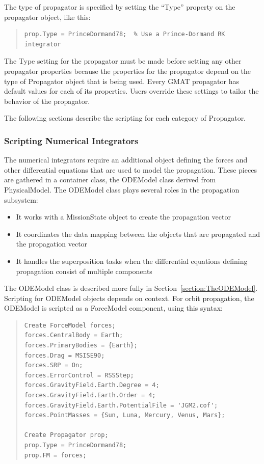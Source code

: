 The type of propagator is specified by setting the ``Type'' property on the propagator object, like
this:
\begin{quote}
\begin{verbatim}
prop.Type = PrinceDormand78;  % Use a Prince-Dormand RK integrator
\end{verbatim}
\end{quote}

\noindent The Type setting for the propagator must be made before setting any other propagator
properties because the properties for the propagator depend on the type of Propagator object that is
being used.  Every GMAT propagator has default values for each of its properties.  Users override
these settings to tailor the behavior of the propagator.

The following sections describe the scripting for each category of Propagator.

\subsubsection{Scripting Numerical Integrators}

The numerical integrators require an additional object defining the forces and other differential
equations that are used to model the propagation.  These pieces are gathered in a container class,
the ODEModel class derived from PhysicalModel.  The ODEModel class plays several roles in the
propagation subsystem:

\begin{itemize}
\item It works with a MissionState object to create the propagation vector
\item It coordinates the data mapping between the objects that are propagated and the propagation
vector
\item It handles the superposition tasks when the differential equations defining propagation
consist of multiple components
\end{itemize}

\noindent The ODEModel class is described more fully in Section~\ref{section:TheODEModel}.
Scripting for ODEModel objects depends on context.  For orbit propagation, the ODEModel is scripted
as a ForceModel component, using this syntax:

\begin{quote}
\begin{verbatim}
Create ForceModel forces;
forces.CentralBody = Earth;
forces.PrimaryBodies = {Earth};
forces.Drag = MSISE90;
forces.SRP = On;
forces.ErrorControl = RSSStep;
forces.GravityField.Earth.Degree = 4;
forces.GravityField.Earth.Order = 4;
forces.GravityField.Earth.PotentialFile = 'JGM2.cof';
forces.PointMasses = {Sun, Luna, Mercury, Venus, Mars};

Create Propagator prop;
prop.Type = PrinceDormand78;
prop.FM = forces;
\end{verbatim}
\end{quote}

